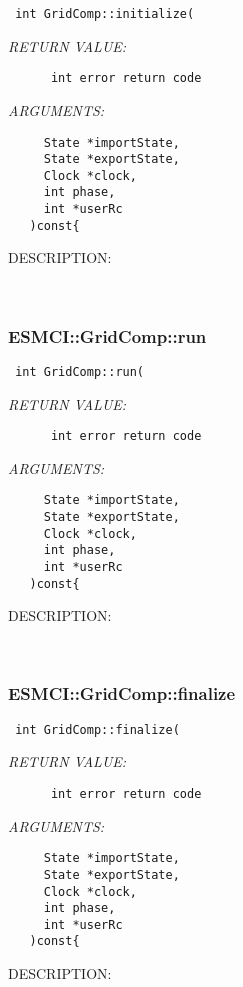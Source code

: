   
\begin{verbatim} int GridComp::initialize(\end{verbatim}{\em RETURN VALUE:}
\begin{verbatim}      int error return code\end{verbatim}{\em ARGUMENTS:}
\begin{verbatim}     State *importState,
     State *exportState,
     Clock *clock,
     int phase,
     int *userRc
   )const{\end{verbatim}
{\sf DESCRIPTION:\\ }


   
 
\mbox{}\hrulefill\
 
\subsubsection [ESMCI::GridComp::run] {ESMCI::GridComp::run}


  
\begin{verbatim} int GridComp::run(\end{verbatim}{\em RETURN VALUE:}
\begin{verbatim}      int error return code\end{verbatim}{\em ARGUMENTS:}
\begin{verbatim}     State *importState,
     State *exportState,
     Clock *clock,
     int phase,
     int *userRc
   )const{\end{verbatim}
{\sf DESCRIPTION:\\ }


   
 
\mbox{}\hrulefill\
 
\subsubsection [ESMCI::GridComp::finalize] {ESMCI::GridComp::finalize}


  
\begin{verbatim} int GridComp::finalize(\end{verbatim}{\em RETURN VALUE:}
\begin{verbatim}      int error return code\end{verbatim}{\em ARGUMENTS:}
\begin{verbatim}     State *importState,
     State *exportState,
     Clock *clock,
     int phase,
     int *userRc
   )const{\end{verbatim}
{\sf DESCRIPTION:\\ }


